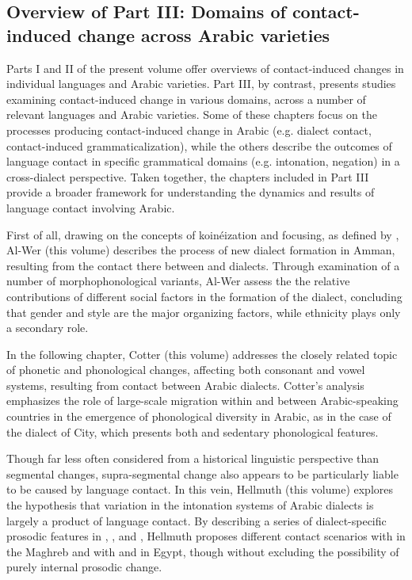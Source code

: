 \documentclass[output=paper]{langsci/langscibook}
\begin{document}
\subsection{Overview of Part III: Domains of contact-induced
change across Arabic varieties}\label{intropartIIIoverview}
Parts I and II of the present volume offer overviews of contact-induced changes in individual languages and Arabic varieties. Part III, by contrast, presents studies examining contact-induced change in various domains, across a number of relevant languages and Arabic varieties. Some of these chapters focus on the processes producing contact-induced change in Arabic (e.g. dialect contact, contact-induced grammaticalization), while the others describe the outcomes of language contact in specific grammatical domains (e.g. intonation, negation) in a cross-dialect perspective. Taken together, the chapters included in Part III provide a broader framework for understanding the dynamics and results of language contact involving Arabic. 

First of all, drawing on the concepts of koinéization and focusing, as defined by \citet{Trudgill2004}, Al-Wer (this volume) describes the process of new dialect formation in Amman, resulting from the contact there between  and  dialects. Through examination of a number of morphophonological variants, Al-Wer assess the the relative contributions of different social factors in the formation of the  dialect, concluding that gender and style are the major organizing factors, while ethnicity plays only a secondary role.

In the following chapter, Cotter (this volume) addresses the closely related topic of phonetic and phonological changes, affecting both consonant and vowel systems, resulting from  contact between Arabic dialects. Cotter's analysis emphasizes the role of large-scale migration within and between Arabic-speaking countries in the emergence of phonological diversity in Arabic, as in the case of the dialect of  City, which presents both  and sedentary phonological features.

Though far less often considered from a historical linguistic perspective than segmental changes, supra-segmental change also appears to be particularly liable to be caused by language contact. In this vein, Hellmuth (this volume) explores the hypothesis that variation in the intonation systems of Arabic dialects is largely a product of language contact. By describing a series of dialect-specific prosodic features in , , and , Hellmuth proposes different contact scenarios with  in the Maghreb and with  and  in Egypt, though without excluding the possibility of purely internal prosodic change. 
\end{document}
